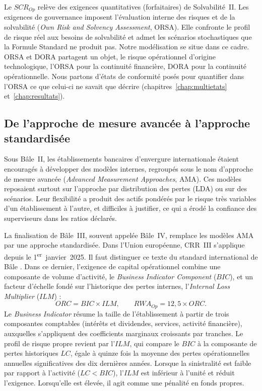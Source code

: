 Le $SCR_{Op}$ relève des exigences quantitatives (forfaitaires) de Solvabilité~II. Les exigences de gouvernance imposent l'évaluation
interne des risques et de la solvabilité (\emph{Own Risk and Solvency Assessment}, ORSA). Elle
confronte le profil de risque réel aux besoins de solvabilité et admet les scénarios stochastiques
que la Formule Standard ne produit pas. Notre modélisation se situe dans ce cadre. ORSA et DORA
partagent un objet, le risque opérationnel d'origine technologique, l'ORSA pour la continuité
financière, DORA pour la continuité opérationnelle. Nous partons d'états de conformité posés pour quantifier dans l'ORSA ce que celui-ci ne savait que décrire (chapitres~\ref{chap:multietats}
et~\ref{chap:resultats}).

\subsection{De l'approche de mesure avancée à l'approche standardisée}
\label{subsec:ama-sma}

Sous Bâle~II, les établissements bancaires d'envergure internationale étaient encouragés à développer
des modèles internes, regroupés sous le nom d'approche de mesure avancée (\emph{Advanced Measurement
Approaches}, AMA). Ces modèles reposaient surtout sur l'approche par distribution des pertes (LDA) ou
sur des scénarios. Leur flexibilité a produit des actifs pondérés par le risque très variables d'un
établissement à l'autre, et difficiles à justifier, ce qui a érodé la confiance des superviseurs dans les
ratios déclarés.

La finalisation de Bâle~III, souvent appelée Bâle~IV, remplace les modèles AMA par une approche standardisée.
Dans l'Union européenne, CRR~III s'applique depuis le 1\textsuperscript{er}~janvier~2025. Il faut distinguer
ce texte du standard international de Bâle \citep{CRRIII2024}. Dans ce dernier, l'exigence de
capital opérationnel combine une composante de volume d'activité, le \emph{Business
Indicator Component} ($BIC$), et un facteur d'échelle fondé sur l'historique des pertes internes,
l'\emph{Internal Loss Multiplier} ($ILM$) :
\begin{equation}
ORC = BIC \times ILM,
\qquad
RWA_{Op} = 12{,}5 \times ORC.
\end{equation}
Le \emph{Business Indicator} résume la taille de l'établissement à partir de trois composantes comptables
(intérêts et dividendes, services, activité financière), auxquelles s'appliquent des coefficients
marginaux croissants par tranches. Le profil de risque propre revient par l'$ILM$, qui compare le $BIC$ à
la composante de pertes historiques $LC$, égale à quinze fois la moyenne des pertes opérationnelles
annuelles significatives des dix dernières années. Lorsque la sinistralité est faible par rapport à
l'activité ($LC < BIC$), l'$ILM$ est inférieur à l'unité et réduit l'exigence. Lorsqu'elle est élevée, il
agit comme une pénalité en fonds propres.

